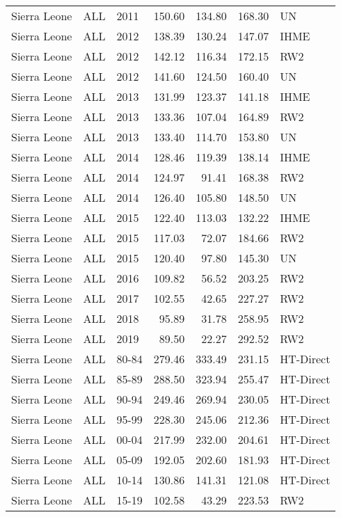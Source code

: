 \begin{longtable}{lllrrrl}
  Sierra Leone & ALL & 2011 & 150.60 & 134.80 & 168.30 & UN \\ 
  Sierra Leone & ALL & 2012 & 138.39 & 130.24 & 147.07 & IHME \\ 
  Sierra Leone & ALL & 2012 & 142.12 & 116.34 & 172.15 & RW2 \\ 
  Sierra Leone & ALL & 2012 & 141.60 & 124.50 & 160.40 & UN \\ 
  Sierra Leone & ALL & 2013 & 131.99 & 123.37 & 141.18 & IHME \\ 
  Sierra Leone & ALL & 2013 & 133.36 & 107.04 & 164.89 & RW2 \\ 
  Sierra Leone & ALL & 2013 & 133.40 & 114.70 & 153.80 & UN \\ 
  Sierra Leone & ALL & 2014 & 128.46 & 119.39 & 138.14 & IHME \\ 
  Sierra Leone & ALL & 2014 & 124.97 & 91.41 & 168.38 & RW2 \\ 
  Sierra Leone & ALL & 2014 & 126.40 & 105.80 & 148.50 & UN \\ 
  Sierra Leone & ALL & 2015 & 122.40 & 113.03 & 132.22 & IHME \\ 
  Sierra Leone & ALL & 2015 & 117.03 & 72.07 & 184.66 & RW2 \\ 
  Sierra Leone & ALL & 2015 & 120.40 & 97.80 & 145.30 & UN \\ 
  Sierra Leone & ALL & 2016 & 109.82 & 56.52 & 203.25 & RW2 \\ 
  Sierra Leone & ALL & 2017 & 102.55 & 42.65 & 227.27 & RW2 \\ 
  Sierra Leone & ALL & 2018 & 95.89 & 31.78 & 258.95 & RW2 \\ 
  Sierra Leone & ALL & 2019 & 89.50 & 22.27 & 292.52 & RW2 \\ 
  Sierra Leone & ALL & 80-84 & 279.46 & 333.49 & 231.15 & HT-Direct \\ 
  Sierra Leone & ALL & 85-89 & 288.50 & 323.94 & 255.47 & HT-Direct \\ 
  Sierra Leone & ALL & 90-94 & 249.46 & 269.94 & 230.05 & HT-Direct \\ 
  Sierra Leone & ALL & 95-99 & 228.30 & 245.06 & 212.36 & HT-Direct \\ 
  Sierra Leone & ALL & 00-04 & 217.99 & 232.00 & 204.61 & HT-Direct \\ 
  Sierra Leone & ALL & 05-09 & 192.05 & 202.60 & 181.93 & HT-Direct \\ 
  Sierra Leone & ALL & 10-14 & 130.86 & 141.31 & 121.08 & HT-Direct \\ 
  Sierra Leone & ALL & 15-19 & 102.58 & 43.29 & 223.53 & RW2 \\ 

\end{longtable}
